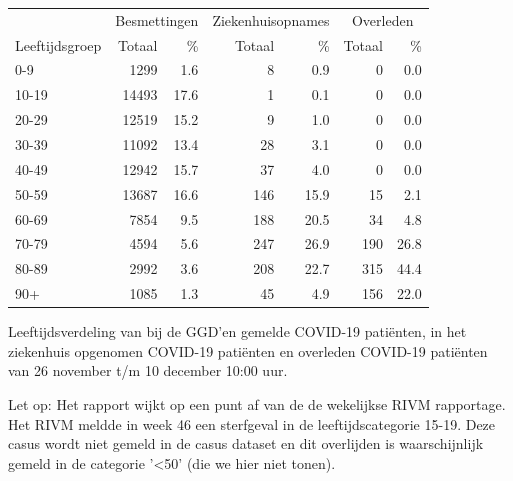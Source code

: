 \documentclass[
  english,
  man,floatsintext]{apa6}
\begin{document}
\begin{table}[H]
\centering\begingroup\fontsize{11}{13}\selectfont

\begin{threeparttable}
\begin{tabular}{lrrrrrr}
\toprule
\multicolumn{1}{c}{ } & \multicolumn{2}{c}{Besmettingen} & \multicolumn{2}{c}{Ziekenhuisopnames} & \multicolumn{2}{c}{Overleden} \\
\cmidrule(l{3pt}r{3pt}){2-3} \cmidrule(l{3pt}r{3pt}){4-5} \cmidrule(l{3pt}r{3pt}){6-7}
Leeftijdsgroep & Totaal & \% & Totaal & \% & Totaal & \%\\
\midrule
0-9 & 1299 & 1.6 & 8 & 0.9 & 0 & 0.0\\
10-19 & 14493 & 17.6 & 1 & 0.1 & 0 & 0.0\\
20-29 & 12519 & 15.2 & 9 & 1.0 & 0 & 0.0\\
30-39 & 11092 & 13.4 & 28 & 3.1 & 0 & 0.0\\
40-49 & 12942 & 15.7 & 37 & 4.0 & 0 & 0.0\\
50-59 & 13687 & 16.6 & 146 & 15.9 & 15 & 2.1\\
60-69 & 7854 & 9.5 & 188 & 20.5 & 34 & 4.8\\
70-79 & 4594 & 5.6 & 247 & 26.9 & 190 & 26.8\\
80-89 & 2992 & 3.6 & 208 & 22.7 & 315 & 44.4\\
90+ & 1085 & 1.3 & 45 & 4.9 & 156 & 22.0\\
\bottomrule
\end{tabular}
\begin{tablenotes}
\item[1] Leeftijdsverdeling van bij de GGD’en gemelde COVID-19 patiënten, in het ziekenhuis opgenomen COVID-19 patiënten en overleden COVID-19 patiënten van 26 november t/m 10 december 10:00 uur.
\item[2] Let op: Het rapport wijkt op een punt af van de de wekelijkse RIVM rapportage. Het RIVM meldde in week 46 een sterfgeval in de leeftijdscategorie 15-19. Deze casus wordt niet gemeld in de casus dataset en dit overlijden is waarschijnlijk gemeld in de categorie '<50' (die we hier niet tonen).
\end{tablenotes}
\end{threeparttable}
\endgroup{}
\end{table}

\newpage
\end{document}
